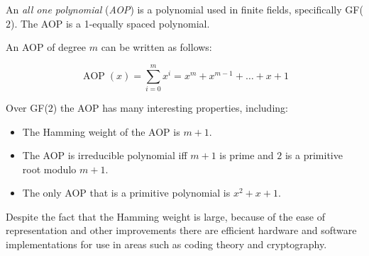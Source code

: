 \documentclass[12pt]{article}
\begin{document}
An \emph{all one polynomial} (\emph{AOP}) is a polynomial used in finite fields, specifically GF($2$).  The AOP is a 1-equally spaced polynomial.

An AOP of degree $m$ can be written as follows:

$$\operatorname{AOP}(x) = \sum_{i=0}^{m} x^i = x^m + x^{m-1} + \ldots + x + 1$$

Over GF($2$) the AOP has many interesting properties, including:

\begin{itemize}
\item The Hamming weight of the AOP is $m + 1$.
\item The AOP is irreducible polynomial iff $m+1$ is prime and $2$ is a primitive root modulo $m+1$.
\item The only AOP that is a primitive polynomial is $x^2 + x + 1$.
\end{itemize}

Despite the fact that the Hamming weight is large, because of the ease of representation and other improvements there are efficient hardware and software implementations for use in areas such as coding theory and cryptography.
\end{document}
